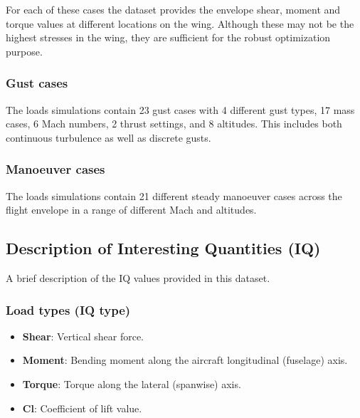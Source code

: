 For each of these cases the dataset provides the envelope shear, moment and torque values at different locations on the wing. Although these may not be the highest stresses in the wing, they are sufficient for the robust optimization purpose.

\subsubsection{Gust cases}

The loads simulations contain 23 gust cases with 4 different gust types, 17 mass cases, 6 Mach numbers, 2 thrust settings, and 8 altitudes. This includes both continuous turbulence as well as discrete gusts.

\subsubsection{Manoeuver cases}

The loads simulations contain 21 different steady manoeuver cases across the flight envelope in a range of different Mach and altitudes.

\subsection{Description of Interesting Quantities (IQ)} \label{sec_IQ}

A brief description of the IQ values provided in this dataset.

\subsubsection{Load types (IQ type)}
\begin{itemize}
  \item \textbf{Shear}: Vertical shear force.%
  \item \textbf{Moment}: Bending moment along the aircraft longitudinal (fuselage) axis.%
  \item \textbf{Torque}: Torque along the lateral (spanwise) axis.%
  \item \textbf{Cl}: Coefficient of lift value.%
\end{itemize}

